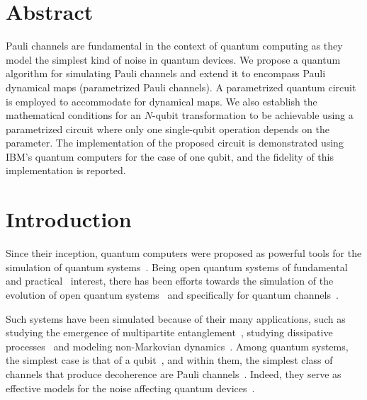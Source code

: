 \documentclass[10pt,letterpaper]{article} %
\begin{document}
\section*{Abstract}
Pauli channels are fundamental in the context of quantum computing as they
model the simplest kind of noise in quantum devices.  We propose a quantum
algorithm for simulating
Pauli channels 
and extend it to encompass Pauli dynamical maps 
(parametrized Pauli channels).
A parametrized quantum circuit is employed to accommodate for dynamical maps. 
We also establish the mathematical conditions for an
$N$-qubit transformation to be achievable using a parametrized circuit where
only one single-qubit operation depends on the parameter. 
The implementation of the proposed circuit is demonstrated using IBM's quantum computers 
for the case of one qubit, and the fidelity of this implementation is reported. 


\section{Introduction} %



Since their inception, quantum computers were proposed as powerful tools for
the simulation of quantum systems~\cite{feynman1982simulating}.  Being open
quantum systems of fundamental~\cite{Zur91,RevModPhys.76.1267} and
practical~\cite{breuer2007theory} interest, there has been efforts towards the
simulation of the evolution of open quantum systems~\cite{Garcia, Wang,Weimer}
and specifically for quantum channels~\cite{Xin,Wei,Zanetti}.

Such systems have been simulated because of their many applications, 
such as studying the emergence of multipartite entanglement~\cite{Andrea,Andrea_AD},
studying dissipative processes~\cite{Barreiro}
and modeling non-Markovian dynamics~\cite{Marsden}.
Among quantum systems, the simplest case is that of a qubit~\cite{chuangbook},
and within them, the simplest class of channels that produce decoherence are
Pauli channels~\cite{geometry,Zbigniew,Davalos}. Indeed, they serve as
effective models for the noise affecting quantum devices~\cite{Flammia}.
\end{document}
